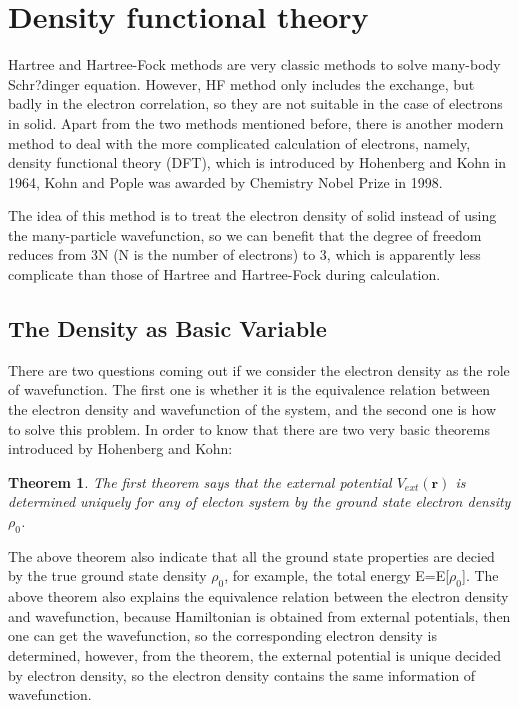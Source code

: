 \documentclass[a4paper, 12pt, titlepage,oneside,drop]{kthesis}
\newtheorem{thm}{Theorem}
\begin{document}
\section{Density functional theory}
\noindent Hartree and Hartree-Fock methods are very classic methods to solve many-body Schr?dinger equation. However, HF method only includes the exchange,
 but badly in the electron correlation, so they are not suitable in the case of electrons in solid. Apart from the two methods mentioned before, there is another modern method to deal with
 the more complicated calculation of electrons, namely, density functional theory (DFT), which is introduced by Hohenberg and
 Kohn in 1964, Kohn and Pople was awarded by Chemistry Nobel Prize in 1998.

\noindent The idea of this method is to treat the electron density of solid instead of using the many-particle wavefunction, so we can
 benefit that the degree of freedom reduces from 3N (N is the number of electrons) to 3, which is apparently less complicate than 
those of Hartree and Hartree-Fock during calculation. 

\subsection{The Density as Basic Variable}
\noindent There are two questions coming out if we consider the electron density as the role of wavefunction. The first one is whether it
 is the equivalence relation between the electron density and wavefunction of the system, and the second one is how to solve this 
problem. In order to know that there are two very basic theorems introduced by Hohenberg and Kohn:

\begin{thm}
\label{hk1}
\noindent The first theorem says that the external potential $V_\textit{ext}(\textbf{r})$  is determined uniquely for any of electon system by the ground state electron density $\rho_0$.
\end{thm}

\noindent The above theorem also indicate that all the ground state properties are decied by the true ground state density $\rho_0$,
for example, the total energy E=E[$\rho_0$]. 
\noindent The above theorem also explains the equivalence relation between the electron density and wavefunction, because Hamiltonian is obtained from external potentials,
then one can get the wavefunction, so the corresponding electron density is determined, however, from the theorem, the external potential is unique decided by electron
density, so the electron density contains the same information of wavefunction.
\end{document}
